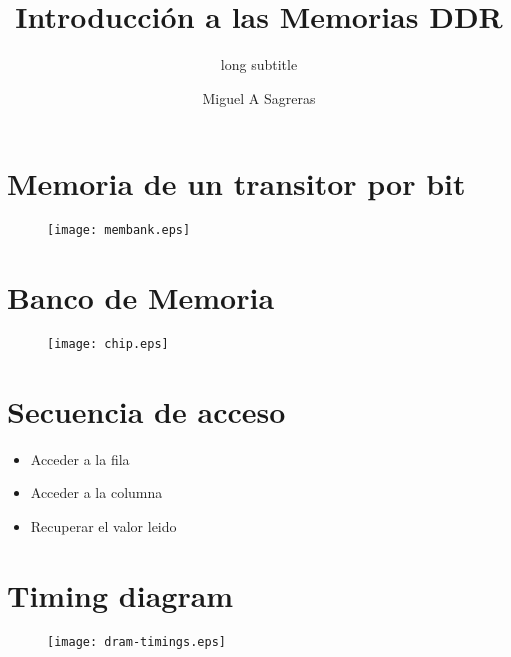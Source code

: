 \documentclass{beamer}
\title[Memoria DDR]{Introducción a las Memorias DDR}
\subtitle[short subtitle]{long subtitle}
\author[msagre]{Miguel A Sagreras}
\date[2015]{}
\begin{document}
\begin{frame}
\titlepage
\tableofcontents
\end{frame}

\section{Memoria de un transitor por bit}
\begin{frame}
\end{frame}

\begin{frame}
\begin{figure}[!htb]
\centering
\texttt{[image: membank.eps]}
\end{figure}
\end{frame}

\section{Banco de Memoria}
\begin{frame}
\begin{figure}[!htb]
\centering
\texttt{[image: chip.eps]}
\end{figure}
\end{frame}

\section{Secuencia de acceso}
\begin{frame}
	\begin{itemize}
		\item Acceder a la fila
		\item Acceder a la columna
		\item Recuperar el valor leido
	\end{itemize}
\end{frame}

\section{Timing diagram}
\begin{frame}
\begin{figure}[!htb]
\centering
\texttt{[image: dram-timings.eps]}
\end{figure}
\end{frame}
\end{document}
